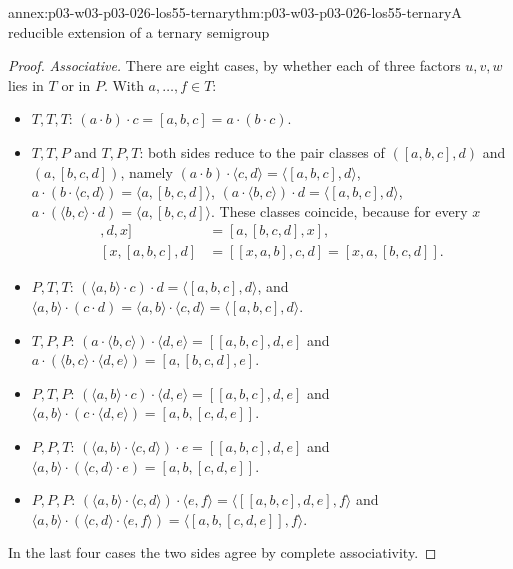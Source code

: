 \begin{annexitem}{annex:p03-w03-p03-026-los55-ternary}{thm:p03-w03-p03-026-los55-ternary}{A reducible extension of a ternary semigroup}
\begin{proof}
\emph{Associative.}  There are eight cases, by whether each of three factors
\(u,v,w\) lies in \(T\) or in \(P\).  With \(a,\ldots,f\in T\):
\begin{itemize}
 \item \(T,T,T\): \((a\cdot b)\cdot c=[a,b,c]=a\cdot(b\cdot c)\).
 \item \(T,T,P\) and \(T,P,T\): both sides reduce to the pair classes of
       \(([a,b,c],d)\) and \((a,[b,c,d])\), namely
       \((a\cdot b)\cdot\langle c,d\rangle=\langle[a,b,c],d\rangle\),
       \(a\cdot(b\cdot\langle c,d\rangle)=\langle a,[b,c,d]\rangle\),
       \((a\cdot\langle b,c\rangle)\cdot d=\langle[a,b,c],d\rangle\),
       \(a\cdot(\langle b,c\rangle\cdot d)=\langle a,[b,c,d]\rangle\).  These
       classes coincide, because for every \(x\)
       \begin{align*}
        [[a,b,c],d,x]&=[a,[b,c,d],x],\\
        [x,[a,b,c],d]&=[[x,a,b],c,d]=[x,a,[b,c,d]].
       \end{align*}
 \item \(P,T,T\): \((\langle a,b\rangle\cdot c)\cdot d=\langle[a,b,c],d\rangle\), and
       \(\langle a,b\rangle\cdot(c\cdot d)=\langle a,b\rangle\cdot\langle c,d\rangle=\langle[a,b,c],d\rangle\).
 \item \(T,P,P\): \((a\cdot\langle b,c\rangle)\cdot\langle d,e\rangle=[[a,b,c],d,e]\)
       and \(a\cdot(\langle b,c\rangle\cdot\langle d,e\rangle)=[a,[b,c,d],e]\).
 \item \(P,T,P\): \((\langle a,b\rangle\cdot c)\cdot\langle d,e\rangle=[[a,b,c],d,e]\)
       and \(\langle a,b\rangle\cdot(c\cdot\langle d,e\rangle)=[a,b,[c,d,e]]\).
 \item \(P,P,T\): \((\langle a,b\rangle\cdot\langle c,d\rangle)\cdot e=[[a,b,c],d,e]\)
       and \(\langle a,b\rangle\cdot(\langle c,d\rangle\cdot e)=[a,b,[c,d,e]]\).
 \item \(P,P,P\):
       \((\langle a,b\rangle\cdot\langle c,d\rangle)\cdot\langle e,f\rangle=\langle[[a,b,c],d,e],f\rangle\)
       and
       \(\langle a,b\rangle\cdot(\langle c,d\rangle\cdot\langle e,f\rangle)=\langle[a,b,[c,d,e]],f\rangle\).
\end{itemize}
In the last four cases the two sides agree by complete associativity.


\end{proof}
\end{annexitem}
